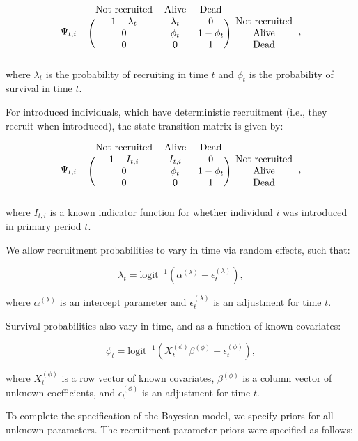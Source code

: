 \documentclass[9pt,twoside,lineno]{pnas-new-SI}
\begin{document}
\[
\Psi_{t, i} =
\begin{blockarray}{cccc}
  \text{Not recruited} & \text{Alive} & \text{Dead} \\
\begin{block}{(ccc)c}
  1 - \lambda_t & \lambda_t & 0 & \text{Not recruited} \\
  0 & \phi_t & 1 - \phi_t & \text{Alive} \\
  0 & 0 & 1 & \text{Dead} \\
\end{block}
\end{blockarray},
\] where \(\lambda_t\) is the probability of recruiting in time \(t\)
and \(\phi_t\) is the probability of survival in time \(t\).

For introduced individuals, which have deterministic recruitment (i.e.,
they recruit when introduced), the state transition matrix is given by:

\[
\Psi_{t, i} =
\begin{blockarray}{cccc}
  \text{Not recruited} & \text{Alive} & \text{Dead} \\
\begin{block}{(ccc)c}
  1 - I_{t, i} & I_{t, i} & 0 & \text{Not recruited} \\
  0 & \phi_t & 1 - \phi_t & \text{Alive} \\
  0 & 0 & 1 & \text{Dead} \\
\end{block}
\end{blockarray},
\] where \(I_{t, i}\) is a known indicator function for whether
individual \(i\) was introduced in primary period \(t\).

We allow recruitment probabilities to vary in time via random effects,
such that:

\[\lambda_t = \text{logit}^{-1}(\alpha^{(\lambda)} + \epsilon^{(\lambda)}_t),\]

where \(\alpha^{(\lambda)}\) is an intercept parameter and
\(\epsilon^{(\lambda)}_t\) is an adjustment for time \(t\).

Survival probabilities also vary in time, and as a function of known
covariates:

\[\phi_t = \text{logit}^{-1}(X^{(\phi)}_t \beta^{(\phi)} + \epsilon^{(\phi)}_t),\]

where \(X^{(\phi)}_t\) is a row vector of known covariates,
\(\beta^{(\phi)}\) is a column vector of unknown coefficients, and
\(\epsilon^{(\phi)}_t\) is an adjustment for time \(t\).

To complete the specification of the Bayesian model, we specify priors
for all unknown parameters. The recruitment parameter priors were
specified as follows:
\end{document}

